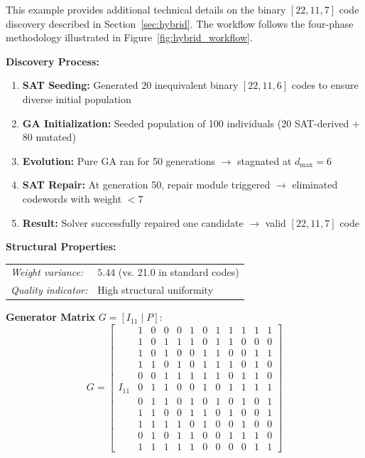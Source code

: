 \begin{colorexamplebox}
This example provides additional technical details on the binary $[22,11,7]$ code discovery described in Section~\ref{sec:hybrid}. The workflow follows the four-phase methodology illustrated in Figure~\ref{fig:hybrid_workflow}.

\tcbline

\textbf{Discovery Process:}
\begin{enumerate}[leftmargin=*, nosep]
\item \textbf{SAT Seeding:} Generated 20 inequivalent binary $[22,11,6]$ codes to ensure diverse initial population
\item \textbf{GA Initialization:} Seeded population of 100 individuals (20 SAT-derived $+$ 80 mutated)
\item \textbf{Evolution:} Pure GA ran for 50 generations $\to$ stagnated at $d_{\max} = 6$
\item \textbf{SAT Repair:} At generation 50, repair module triggered $\to$ eliminated codewords with weight $< 7$
\item \textbf{Result:} Solver successfully repaired one candidate $\to$ valid $[22,11,7]$ code
\end{enumerate}

\tcbline

\textbf{Structural Properties:}\\[0.3em]
\begin{tabular}{@{}ll@{}}
\textit{Weight variance:} & $5.44$ (vs. 21.0 in standard codes) \\
\textit{Quality indicator:} & High structural uniformity
\end{tabular}

\tcbline

\textbf{Generator Matrix} $G = [I_{11} \mid P]$:
{\footnotesize
\[
G = \left[
\begin{array}{c|ccccccccccc}
 & 1 & 0 & 0 & 0 & 1 & 0 & 1 & 1 & 1 & 1 & 1 \\
 & 1 & 0 & 1 & 1 & 1 & 0 & 1 & 1 & 0 & 0 & 0 \\
 & 1 & 0 & 1 & 0 & 0 & 1 & 1 & 0 & 0 & 1 & 1 \\
 & 1 & 1 & 0 & 1 & 0 & 1 & 1 & 1 & 0 & 1 & 0 \\
 & 0 & 0 & 1 & 1 & 1 & 1 & 1 & 0 & 1 & 1 & 0 \\
I_{11} & 0 & 1 & 1 & 0 & 0 & 1 & 0 & 1 & 1 & 1 & 1 \\
 & 0 & 1 & 1 & 0 & 1 & 0 & 1 & 0 & 1 & 0 & 1 \\
 & 1 & 1 & 0 & 0 & 1 & 1 & 0 & 1 & 0 & 0 & 1 \\
 & 1 & 1 & 1 & 1 & 0 & 1 & 0 & 0 & 1 & 0 & 0 \\
 & 0 & 1 & 0 & 1 & 1 & 0 & 0 & 1 & 1 & 1 & 0 \\
 & 1 & 1 & 1 & 1 & 1 & 0 & 0 & 0 & 0 & 1 & 1
\end{array}
\right]
\]
}


\end{colorexamplebox}
